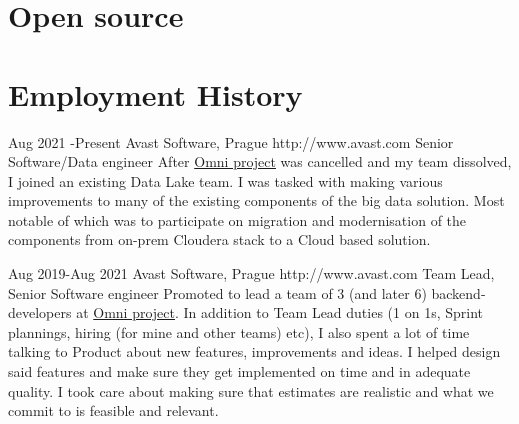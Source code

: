 \documentclass[10pt]{article} %
\begin{document}


    \section{Open source}



    \section{Employment History}

    \job
    {Aug 2021 -}{Present}
    {Avast Software, Prague}
    {http://www.avast.com}
    {Senior Software/Data engineer}
    {After \href{https://www.avast.com/en-us/omni}{Omni project} was cancelled and my team dissolved, I joined an existing Data Lake team. I was tasked with making various improvements
    to many of the existing components of the big data solution. Most notable of which was to participate on migration and modernisation of the components from on-prem Cloudera stack to a Cloud based solution.\\

    }


    \job
    {Aug 2019-}{Aug 2021}
    {Avast Software, Prague}
    {http://www.avast.com}
    {Team Lead, Senior Software engineer}
    {Promoted to lead a team of 3 (and later 6) backend-developers at \href{https://www.avast.com/en-us/omni}{Omni project}. In addition to Team Lead duties (1 on 1s, Sprint plannings, hiring (for mine and other teams) etc), I also spent a lot of time
    talking to Product about new features, improvements and ideas. I helped design said features and make sure they get implemented on time and in adequate quality. I took care about making sure that
    estimates are realistic and what we commit to is feasible and relevant. \\

    }
\end{document}
